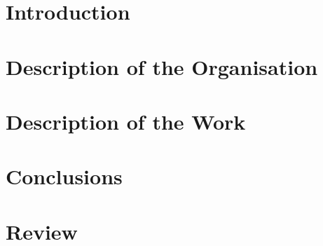 \documentclass{report}
\begin{document}
	\newpage
	\setcounter{page}{1}
	
	\chapter{Introduction}

	\chapter{Description of the Organisation}
	
	\chapter{Description of the Work}
	
	\chapter{Conclusions}
	
	\chapter{Review}
	
\end{document}
